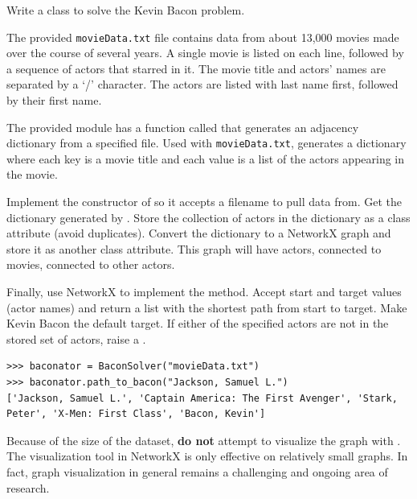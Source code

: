 \begin{problem}
Write a  class to solve the Kevin Bacon problem.

The provided \texttt{movieData.txt} file contains data from about 13,000 movies made over the course of several years.
A single movie is listed on each line, followed by a sequence of actors that starred in it.
The movie title and actors' names are separated by a `/' character.
The actors are listed with last name first, followed by their first name.

The provided  module has a function called  that generates an adjacency dictionary from a specified file.
Used with \texttt{movieData.txt},  generates a dictionary where each key is a movie title and each value is a list of the actors appearing in the movie.

Implement the constructor of  so it accepts a filename to pull data from.
Get the dictionary generated by .
Store the collection of actors in the dictionary as a class attribute (avoid duplicates).
Convert the dictionary to a NetworkX graph and store it as another class attribute.
This graph will have actors, connected to movies, connected to other actors.

Finally, use NetworkX to implement the  method.
Accept start and target values (actor names) and return a list with the shortest path from start to target.
Make Kevin Bacon the default target.
If either of the specified actors are not in the stored set of actors, raise a .

\begin{lstlisting}
>>> baconator = BaconSolver("movieData.txt")
>>> baconator.path_to_bacon("Jackson, Samuel L.")
['Jackson, Samuel L.', 'Captain America: The First Avenger', 'Stark,
Peter', 'X-Men: First Class', 'Bacon, Kevin']
\end{lstlisting}

\begin{warn}
Because of the size of the dataset, \textbf{do not} attempt to visualize the graph with .
The visualization tool in NetworkX is only effective on relatively small graphs.
In fact, graph visualization in general remains a challenging and ongoing area of research.
\end{warn}
\end{problem}

